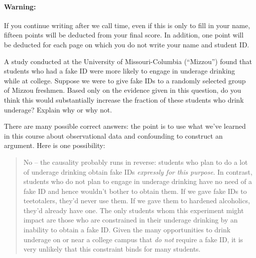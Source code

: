 \documentclass[addpoints,12pt]{exam}
\begin{document}
\paragraph{Warning:} If you continue writing after we call time, even if this is only to fill in your name, fifteen points will be deducted from your final score. In addition, one point will be deducted for each page on which you do not write your name and student ID. 

\newpage
\begin{questions}

\question[10] A study conducted at the University of Missouri-Columbia (``Mizzou'') found that students who had a fake ID were more likely to engage in underage drinking while at college. Suppose we were to give fake IDs to a randomly selected group of Mizzou freshmen. Based only on the evidence given in this question, do you think this would substantially increase the fraction of these students who drink underage? Explain why or why not.
	\begin{solution}[3.5in]
		There are many possible correct answers: the point is to use what we've learned in this course about observational data and confounding to construct an argument. Here is one possibility:
		\begin{quote}
		No -- the causality probably runs in reverse: students who plan to do a lot of underage drinking obtain fake IDs \emph{expressly for this purpose}. In contrast, students who do not plan to engage in underage drinking have no need of a fake ID and hence wouldn't bother to obtain them. If we gave fake IDs to teetotalers, they'd never use them. If we gave them to hardened alcoholics, they'd already have one. The only students whom this experiment might impact are those who are constrained in their underage drinking by an inability to obtain a fake ID. Given the many opportunities to drink underage on or near a college campus that \emph{do not} require a fake ID, it is very unlikely that this constraint binds for many students.\end{quote}
	\end{solution}



\end{questions}
\end{document}
